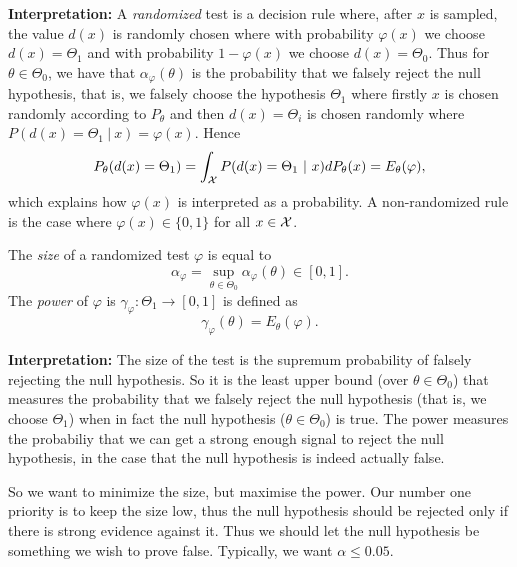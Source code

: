 \documentclass[twoside, a4paper, 10pt]{amsart}
\begin{document}
\textbf{Interpretation:} A \textit{randomized} test is a decision rule where, after $x$ is sampled, the value $d(x)$ is randomly chosen where with probability $\varphi(x)$ we choose $d(x) = \Theta_1$ and with probability $1 - \varphi(x)$ we choose $d(x) = \Theta_0$. Thus for $\theta \in \Theta_0$, we have that $\alpha_{\varphi}(\theta)$ is the probability that we falsely reject the null hypothesis, that is, we falsely choose the hypothesis $\Theta_1$ where firstly $x$ is chosen randomly according to $P_{\theta}$ and then $d(x) = \Theta_i$ is chosen randomly where $P(d(x) = \Theta_1 ~|~ x) = \varphi(x)$. Hence 
$$P_{\theta}(d(x) = \Theta_1) = \int_{\mathcal{X}} P(d(x) = \Theta_1 ~|~ x) dP_{\theta}(x) = E_{\theta}(\varphi), $$ which explains how $\varphi(x)$ is interpreted as a probability. A non-randomized rule is the case where $\varphi(x) \in \{0,1\}$ for all $x \in \mathcal{X}$.

\begin{mydef} The \textit{size} of a randomized test $\varphi$ is equal to $$\alpha_{\varphi} = \sup_{\theta \in \Theta_0} \alpha_{\varphi}(\theta) \in [0,1].$$
The \textit{power} of $\varphi$ is $\gamma_{\varphi}:\Theta_1 \to [0,1]$ is defined as $$\gamma_{\varphi}(\theta) = E_{\theta}(\varphi).$$

\end{mydef}

\textbf{Interpretation:} The size of the test is the supremum probability of falsely rejecting the null hypothesis. So it is the least upper bound (over $\theta \in \Theta_0$) that measures the probability that we falsely reject the null hypothesis (that is, we choose $\Theta_1$) when in fact the null hypothesis ($\theta \in \Theta_0$) is true. The power measures the probabiliy that we can get a strong enough signal to reject the null hypothesis, in the case that the null hypothesis is indeed actually false.

So we want to minimize the size, but maximise the power. Our number one priority is to keep the size low, thus the null hypothesis should be rejected only if there is strong evidence against it. Thus we should let the null hypothesis be something we wish to prove false. Typically, we want $\alpha \leq 0.05$.
\end{document}
